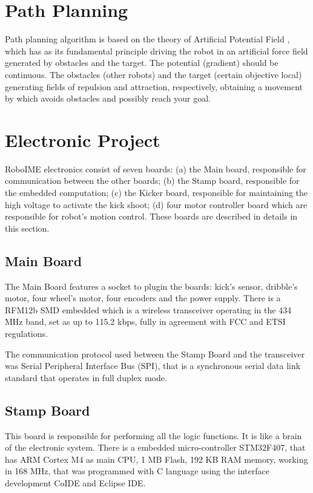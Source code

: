 \documentclass{llncs}
\begin{document}
\section{Path Planning}

Path planning algorithm is based on the theory of Artificial Potential Field \cite{CPA}, which has as its fundamental principle driving
the robot in an artificial force field generated by obstacles and the target. The potential (gradient) should be continuous.
The obstacles (other robots) and the target (certain objective local) generating fields of repulsion and attraction, respectively,
obtaining a movement by which avoids obstacles and possibly reach your goal.


\section{Electronic Project}
RoboIME electronics consist of seven boards: (a) the Main board, responsible for communication between the other boards; (b) the Stamp board,
responsible  for the embedded computation; (c) the Kicker board, responsible for maintaining the high voltage to activate the kick shoot;
(d) four motor controller board which are responsible for robot's motion control. These boards are described in details in this section.

\subsection{Main Board}
The Main Board features a socket to plugin the boards: kick's sensor, dribble's motor, four wheel's motor, four encoders and the power supply.
There is a RFM12b SMD embedded which is a wireless transceiver operating in the 434 MHz band, set as up to 115.2 kbps, fully in agreement
with FCC and ETSI regulations.

The communication protocol used between the Stamp Board and the transceiver was Serial Peripheral Interface Bus (SPI), that  is a synchronous
serial data link standard that operates in full duplex mode.

\subsection{Stamp Board}
This board is responsible  for performing all the logic functions. It is like a brain of the electronic system. There is a embedded micro-controller STM32F407,
that has ARM Cortex M4 as main CPU, 1 MB Flash, 192 KB RAM memory, working in 168 MHz, that was programmed with C language using the  interface development
CoIDE and Eclipse IDE.
\end{document}
